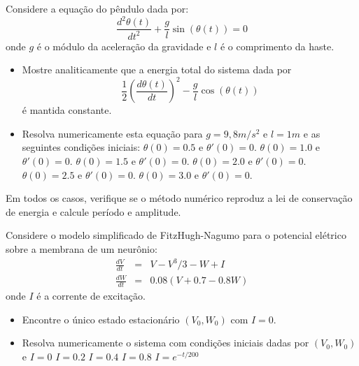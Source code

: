 \begin{Exercise} Considere a equação do pêndulo dada por:
$$\frac{d^2\theta(t)}{dt^2}+\frac{g}{l}\sin(\theta(t))=0$$
onde $g$ é o módulo da aceleração da gravidade e $l$ é o comprimento da haste.
\begin{itemize}
\item Mostre analiticamente que a energia total do sistema dada por
$$\frac{1}{2}\left(\frac{d\theta(t)}{dt}\right)^2-\frac{g}{l}\cos(\theta(t))$$
é mantida constante.
\item Resolva numericamente esta equação para $g=9,8m/s^2$ e $l=1m$ e as seguintes condições iniciais:
\subitem $\theta(0)=0.5$ e $\theta'(0)=0$.
\subitem $\theta(0)=1.0$ e $\theta'(0)=0$.
\subitem $\theta(0)=1.5$ e $\theta'(0)=0$.
\subitem $\theta(0)=2.0$ e $\theta'(0)=0$.
\subitem $\theta(0)=2.5$ e $\theta'(0)=0$.
\subitem $\theta(0)=3.0$ e $\theta'(0)=0$.
\end{itemize}
Em todos os casos, verifique se o método numérico reproduz a lei de conservação de energia e calcule período e amplitude.
\end{Exercise}

\begin{Exercise} Considere o modelo simplificado de FitzHugh-Nagumo para o potencial elétrico sobre a membrana de um neurônio:
\begin{eqnarray*}
\frac{d V}{dt}& = &  V-V^3/3 - W +  I  \\
\frac{d W}{dt} & = & 0.08(V+0.7 - 0.8W)
\end{eqnarray*}
onde $I$ é a corrente de excitação.
\begin{itemize}
\item Encontre o único estado estacionário $\left(V_0,W_0\right)$ com $I=0$.
\item Resolva numericamente o sistema com condições iniciais dadas por $\left(V_0,W_0\right)$ e
\subitem $I=0$
\subitem $I=0.2$
\subitem $I=0.4$
\subitem $I=0.8$
\subitem $I=e^{-t/200}$
\end{itemize}
\end{Exercise}


